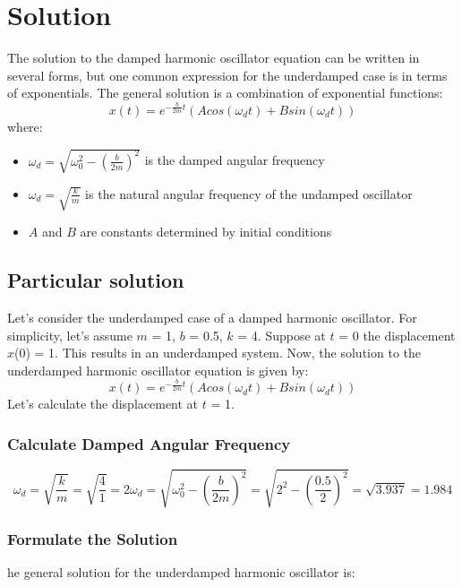 \documentclass{article}
\begin{document}
\section{Solution}
The solution to the damped harmonic oscillator equation can be written in several forms, but one common expression for the underdamped case is in terms of exponentials. The general solution is a combination of exponential functions:
\begin{equation}
    x(t) = e^{-\frac{b}{2m}t}(Acos(\omega_d t) + Bsin(\omega_d t))
\end{equation}
where:
\begin{itemize}
    \item $\omega_d = \sqrt{\omega_0^2 - (\frac{b}{2m})^2}$ is the damped angular frequency
    \item $\omega_d = \sqrt{\frac{k}{m}}$ is the natural angular frequency of the undamped oscillator
    \item  $A$ and $B$ are constants determined by initial conditions
\end{itemize}
\subsection{Particular solution}
Let's consider the underdamped case of a damped harmonic oscillator. For simplicity, let's assume $m$ = 1, $b$ = 0.5, $k$ = 4. Suppose at $t$ = 0 the displacement $x$(0) = 1. This results in an underdamped system.
Now, the solution to the underdamped harmonic oscillator equation is given by:
\begin{equation}
    x(t) = e^{-\frac{b}{2m}t}(Acos(\omega_d t) + Bsin(\omega_d t))
\end{equation}
Let's calculate the displacement at $t$ = 1.

\subsubsection{Calculate Damped Angular Frequency}
\begin{equation}
    \omega_d = \sqrt{\frac{k}{m}} = \sqrt{\frac{4}{1}} = 2
    \omega_d = \sqrt{\omega_0^2 - (\frac{b}{2m})^2} = \sqrt{2^2 - (\frac{0.5}{2})^2} = \sqrt{3.937} = 1.984
 \end{equation}
\subsubsection{Formulate the Solution}
he general solution for the underdamped harmonic oscillator is:
\end{document}
